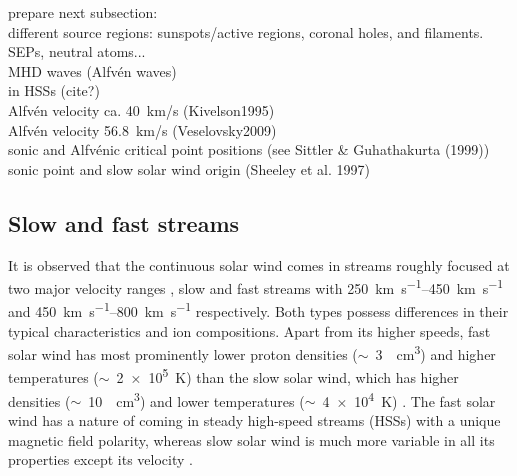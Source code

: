 prepare next subsection:\\
different source regions: sunspots/active regions, coronal holes, and filaments.\\


SEPs, neutral atoms...\\

MHD waves (Alfvén waves)\\
in HSSs (cite?)\\
Alfvén velocity ca. 40~km/s (Kivelson1995)\\
Alfvén velocity 56.8~km/s (Veselovsky2009)\\

sonic and Alfvénic critical point positions (see Sittler \& Guhathakurta (1999))\\
sonic point and slow solar wind origin (Sheeley et al. 1997)\\


\subsection{Slow and fast streams}
It is observed that the continuous solar wind comes in streams roughly focused at two major velocity ranges \citep{Neugebauer1966,Schwenn1983}, slow and fast streams with \SIrange{250}{450}{\km\per\s} and \SIrange{450}{800}{\km\per\s} respectively. Both types possess differences in their typical characteristics and ion compositions. Apart from its higher speeds, fast solar wind has most prominently lower proton densities ($\sim$~\SI{3}{\per\cm\cubed}) and higher temperatures ($\sim$~\SI{2e5}{\K}) than the slow solar wind, which has higher densities ($\sim$~\SI{10}{\per\cm\cubed}) and lower temperatures ($\sim$~\SI{4e4}{\K}) \citep{Schwenn1990}. The fast solar wind has a nature of coming in steady high-speed streams (HSSs) with a unique magnetic field polarity, whereas slow solar wind is much more variable in all its properties except its velocity \citep{Bame1977}.

